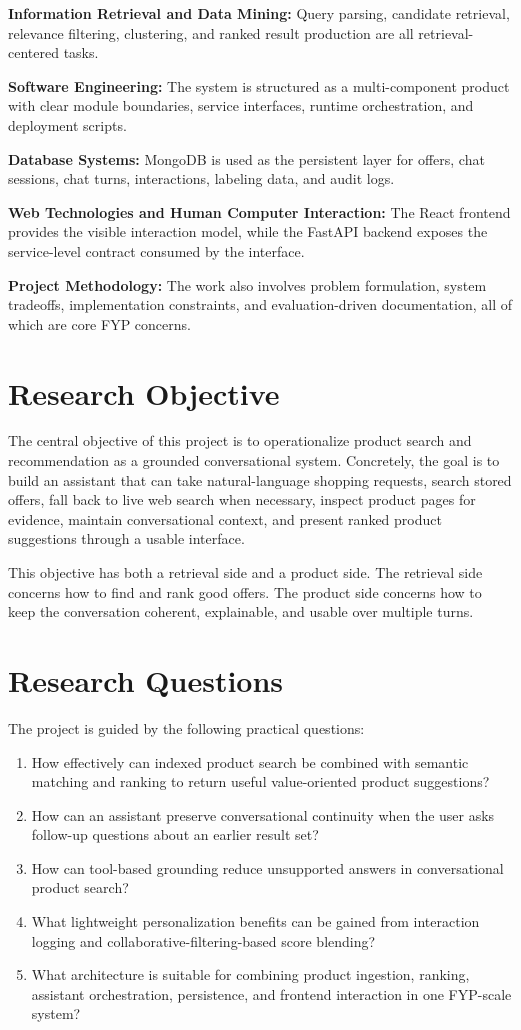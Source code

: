 \documentclass[12pt,a4paper,oneside]{report}
\begin{document}
\textbf{Information Retrieval and Data Mining:} Query parsing, candidate retrieval, relevance filtering, clustering, and ranked result production are all retrieval-centered tasks.

\textbf{Software Engineering:} The system is structured as a multi-component product with clear module boundaries, service interfaces, runtime orchestration, and deployment scripts.

\textbf{Database Systems:} MongoDB is used as the persistent layer for offers, chat sessions, chat turns, interactions, labeling data, and audit logs.

\textbf{Web Technologies and Human Computer Interaction:} The React frontend provides the visible interaction model, while the FastAPI backend exposes the service-level contract consumed by the interface.

\textbf{Project Methodology:} The work also involves problem formulation, system tradeoffs, implementation constraints, and evaluation-driven documentation, all of which are core FYP concerns.

\section{Research Objective}
The central objective of this project is to operationalize product search and recommendation as a grounded conversational system. Concretely, the goal is to build an assistant that can take natural-language shopping requests, search stored offers, fall back to live web search when necessary, inspect product pages for evidence, maintain conversational context, and present ranked product suggestions through a usable interface.

This objective has both a retrieval side and a product side. The retrieval side concerns how to find and rank good offers. The product side concerns how to keep the conversation coherent, explainable, and usable over multiple turns.

\section{Research Questions}
The project is guided by the following practical questions:
\begin{enumerate}[leftmargin=0.35in]
    \item How effectively can indexed product search be combined with semantic matching and ranking to return useful value-oriented product suggestions?
    \item How can an assistant preserve conversational continuity when the user asks follow-up questions about an earlier result set?
    \item How can tool-based grounding reduce unsupported answers in conversational product search?
    \item What lightweight personalization benefits can be gained from interaction logging and collaborative-filtering-based score blending?
    \item What architecture is suitable for combining product ingestion, ranking, assistant orchestration, persistence, and frontend interaction in one FYP-scale system?
\end{enumerate}
\end{document}
